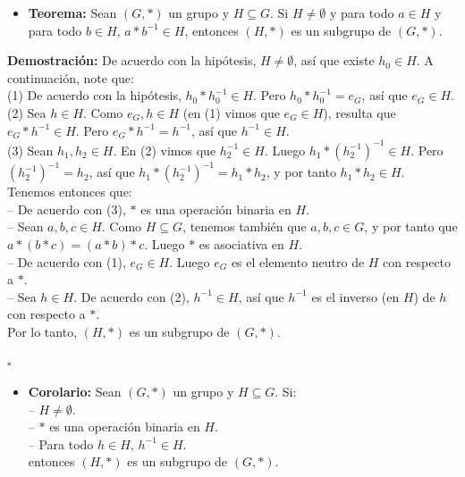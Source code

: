 \documentclass[10 pt]{article}
\begin{document}
\begin{itemize}
    \item \Large{\textbf{Teorema:} Sean $(G,*)$ un grupo y $H \subseteq G$. Si $H \neq \emptyset$ y para todo $a \in H$ y para todo $b \in H$, $a*b^{-1} \in H$, entonces $(H,*)$ es un subgrupo de $(G,*)$.} \\
\end{itemize}

\Large{\textbf{Demostración:} De acuerdo con la hipótesis, $H \neq \emptyset$, así que existe $h_0 \in H$. A continuación, note que: \\

(1) De acuerdo con la hipótesis, $h_0*h_0^{-1} \in H$. Pero $h_0*h_0^{-1}=e_G$, así que $e_G \in H$. \\

(2) Sea $h \in H$. Como $e_G,h \in H$ (en (1) vimos que $e_G \in H$), resulta que $e_G*h^{-1} \in H$. Pero $e_G*h^{-1}=h^{-1}$, así que $h^{-1} \in H$. \\

(3) Sean $h_1,h_2 \in H$. En (2) vimos que $h_2^{-1} \in H$. Luego $h_1*(h_2^{-1})^{-1} \in H$. Pero $(h_2^{-1})^{-1}=h_2$, así que $h_1*(h_2^{-1})^{-1}=h_1*h_2$, y por tanto $h_1*h_2 \in H$. \\
 
Tenemos entonces que: \\

-- De acuerdo con (3), $*$ es una operación binaria en $H$. \\

-- Sean $a,b,c \in H$. Como $H \subseteq G$, tenemos también que $a,b,c \in G$, y por tanto que $a*(b*c)=(a*b)*c$. Luego $*$ es asociativa en $H$. \\

-- De acuerdo con (1), $e_G \in H$. Luego $e_G$ es el elemento neutro de $H$ con respecto a $*$. \\

-- Sea $h \in H$. De acuerdo con (2), $h^{-1} \in H$, así que $h^{-1}$ es el inverso (en $H$) de $h$ con respecto a $*$. \\

Por lo tanto, $(H,*)$ es un subgrupo de $(G,*)$.} \\

\begin{flushright}
    $\square$
\end{flushright}

\begin{itemize}
    \item \Large{\textbf{Corolario:} Sean $(G,*)$ un grupo y $H \subseteq G$. Si: \\

    -- $H \neq \emptyset$. \\

    -- $*$ es una operación binaria en $H$. \\

    -- Para todo $h \in H$, $h^{-1} \in H$. \\

    entonces $(H,*)$ es un subgrupo de $(G,*)$.} \\
\end{itemize}
\end{document}
